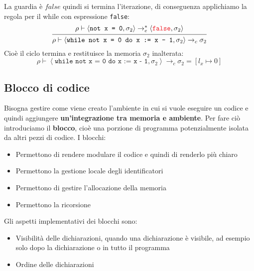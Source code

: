 \documentclass[a4paper]{article}
\begin{document}
\begin{example}
\begin{itemize}
\begin{enumerate}
\begin{enumerate}
\[              \]
          \end{enumerate}
          La guardia è \( false \) quindi si termina l'iterazione, di
          conseguenza applichiamo la regola per il while con espressione \texttt{false}:
          \[
            \begin{prooftree}
              \hypo{ 
                \rho \vdash \left< \texttt{not x = 0}, \sigma_2 \right>
                \to^*_e
                \left< \texttt{\textcolor{Red}{false}}, \sigma_2 \right>
              }
              \infer1{ 
                \rho \vdash \left< \texttt{while not x = 0 do x := x - 1}, \sigma_2  \right> 
                \to_c
                \sigma_2
              }
            \end{prooftree}
          \] 
          Cioè il ciclo termina e restituisce la memoria \( \sigma_2 \)
          inalterata:
          \[
            \rho \vdash \left< \texttt{while not x = 0 do x := x - 1}, \sigma_2  \right> 
            \to_c
            \sigma_2 = \left[ l_x \mapsto 0 \right]
          \] 
      \end{enumerate}
  \end{itemize}
\end{example}

\subsection{Blocco di codice}
Bisogna gestire come viene creato l'ambiente in cui si vuole eseguire un codice e
quindi aggiungere \textbf{un'integrazione tra memoria e ambiente}. Per fare ciò
introduciamo il \textbf{blocco}, cioè una porzione di programma potenzialmente
isolata da altri pezzi di codice. I blocchi:
\begin{itemize} 
  \item Permettono di rendere modulare il codice e quindi di renderlo più chiaro
  \item Permettono la gestione locale degli identificatori
  \item Permettono di gestire l'allocazione della memoria
  \item Permettono la ricorsione
\end{itemize}
Gli aspetti implementativi dei blocchi sono:
\begin{itemize}
  \item Visibilità delle dichiarazioni, quando una dichiarazione è visibile, ad esempio solo dopo la
    dichiarazione o in tutto il programma

  \item Ordine delle dichiarazioni
\end{itemize}
\end{document}
